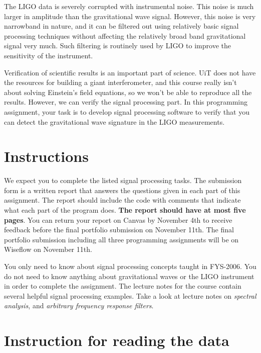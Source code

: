The LIGO data is severely corrupted with instrumental noise. This
noise is much larger in amplitude than the gravitational wave
signal. However, this noise is very narrowband in nature, and it can
be filtered out using relatively basic signal processing techniques
without affecting the relatively broad band gravitational signal very
much. Such filtering is routinely used by LIGO to improve the
sensitivity of the instrument.

Verification of scientific results is an important part of
science. UiT does not have the resources for building a giant
interferometer, and this course really isn't about solving Einstein's
field equations, so we won't be able to reproduce all the
results. However, we can verify the signal processing part. In this
programming assignment, your task is to develop signal processing
software to verify that you can detect the gravitational wave
signature in the LIGO measurements.


\section{Instructions}

We expect you to complete the listed signal processing tasks. The
submission form is a written report that answers the questions given
in each part of this assignment. The report should include the code
with comments that indicate what each part of the program
does. \textbf{The report should have at most five pages}. You can
return your report on Canvas by November 4th to receive feedback
before the final portfolio submission on November 11th. The final
portfolio submission including all three programming assignments will
be on Wiseflow on November 11th.




You only need to know about signal processing concepts taught in
FYS-2006. You do not need to know anything about gravitational waves
or the LIGO instrument in order to complete the assignment. The
lecture notes for the course contain several helpful signal processing
examples. Take a look at lecture notes on \emph{spectral analysis},
and \emph{arbitrary frequency response filters}.


\section{Instruction for reading the data}

